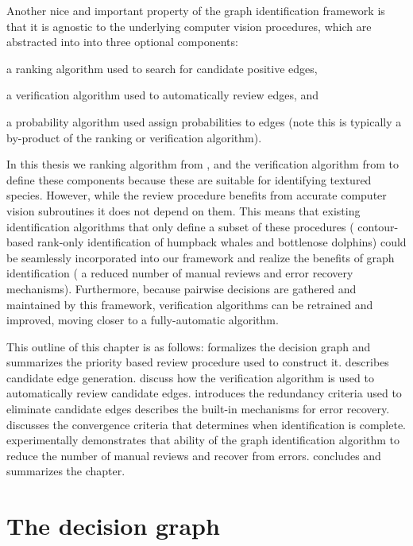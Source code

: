 Another nice and important property of the graph identification framework is
  that it is agnostic to the underlying computer vision procedures, which are
  abstracted into into three optional components:
\begin{enumin}
    \item a ranking algorithm used to search for candidate positive edges, %
    \item a verification algorithm used to automatically review edges, and %
    \item a probability algorithm used assign probabilities to edges (note
      this is typically a by-product of the ranking or verification algorithm).
\end{enumin}
In this thesis we ranking algorithm from , and the
  verification algorithm from  to define these components
  because these are suitable for identifying textured species.
However, while the review procedure benefits from accurate computer vision
  subroutines it does not depend on them.
This means that existing identification algorithms that only define a subset
  of these procedures (\eg{} contour-based rank-only identification of humpback
  whales and bottlenose dolphins) could be seamlessly incorporated into our
  framework and realize the benefits of graph identification (\eg{} a reduced
  number of manual reviews and error recovery mechanisms).
Furthermore, because pairwise decisions are gathered and maintained by this
  framework, verification algorithms can be retrained and improved, moving
  closer to a fully-automatic algorithm.

This outline of this chapter is as follows:
 formalizes the decision graph and summarizes the
  priority based review procedure used to construct it.
 describes candidate edge generation.
 discuss how the verification algorithm is used to
  automatically review candidate edges.
 introduces the redundancy criteria used to eliminate
  candidate edges  describes the built-in mechanisms for error
  recovery.
 discusses the convergence criteria that determines when
  identification is complete.
 experimentally demonstrates that ability of the graph
  identification algorithm to reduce the number of manual reviews and recover
  from errors.
 concludes and summarizes the chapter.


\section{The decision graph}\label{sec:decisiongraph}

